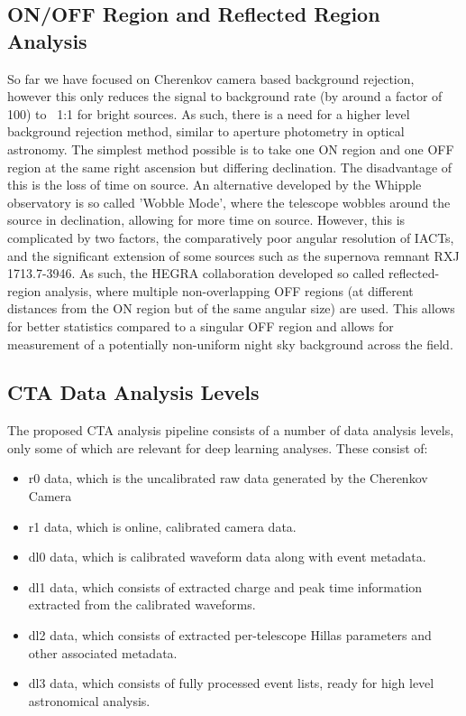 \subsection{ON/OFF Region and Reflected Region Analysis}
So far we have focused on Cherenkov camera based background rejection, however this only reduces the signal to background rate (by around a factor of 100) to ~1:1 for bright sources. As such, there is a need for a higher level background rejection method, similar to aperture photometry in optical astronomy. The simplest method possible is to take one ON region and one OFF region at the same right ascension but differing declination. The disadvantage of this is the loss of time on source. An alternative developed by the Whipple observatory is so called 'Wobble Mode', where the telescope wobbles around the source in declination, allowing for more time on source. However, this is complicated by two factors, the comparatively poor angular resolution of IACTs, and the significant extension of some sources such as the supernova remnant RXJ 1713.7-3946. As such, the HEGRA collaboration \cite{HEGRA} developed so called reflected-region analysis, where multiple non-overlapping OFF regions (at different distances from the ON region but of the same angular size) are used. This allows for better statistics compared to a singular OFF region and allows for measurement of a potentially non-uniform night sky background across the field. 

\subsection{CTA Data Analysis Levels}

The proposed CTA analysis pipeline consists of a number of data analysis levels, only some of which are relevant for deep learning analyses. These consist of:
\begin{itemize}
    \item r0 data, which is the uncalibrated raw data generated by the Cherenkov Camera
    \item r1 data, which is online, calibrated camera data.
    \item dl0 data, which is calibrated waveform data along with event metadata.
    \item dl1 data, which consists of extracted charge and peak time information extracted from the calibrated waveforms.
    \item dl2 data, which consists of extracted per-telescope Hillas parameters and other associated metadata.
    \item dl3 data, which consists of fully processed event lists, ready for high level astronomical analysis.
\end{itemize}

